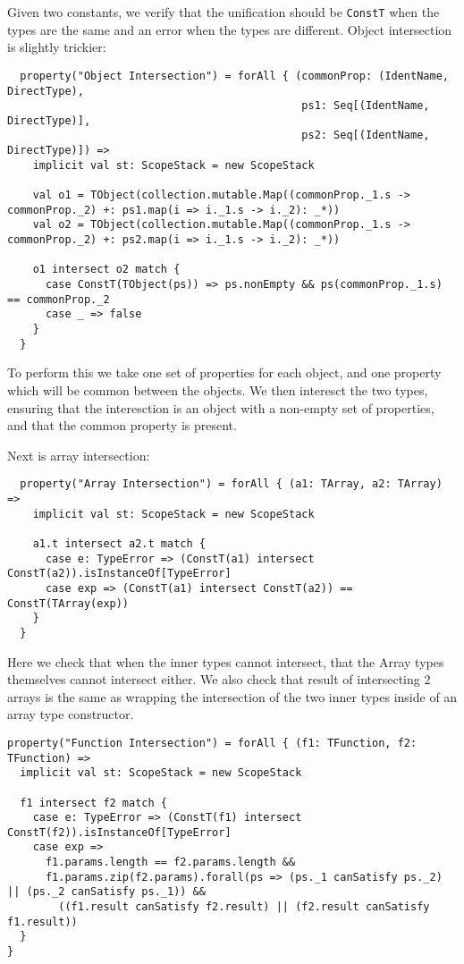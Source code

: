 \documentclass[british, twoside]{bhamthesis}
\theoremstyle{definition}
\begin{document}
      Given two constants, we verify that the unification should be \texttt{ConstT} when the types are the same and an error when the types are different. Object intersection is slightly trickier:
      \begin{lstlisting}
  property("Object Intersection") = forAll { (commonProp: (IdentName, DirectType),
                                              ps1: Seq[(IdentName, DirectType)],
                                              ps2: Seq[(IdentName, DirectType)]) =>
    implicit val st: ScopeStack = new ScopeStack

    val o1 = TObject(collection.mutable.Map((commonProp._1.s -> commonProp._2) +: ps1.map(i => i._1.s -> i._2): _*))
    val o2 = TObject(collection.mutable.Map((commonProp._1.s -> commonProp._2) +: ps2.map(i => i._1.s -> i._2): _*))

    o1 intersect o2 match {
      case ConstT(TObject(ps)) => ps.nonEmpty && ps(commonProp._1.s) == commonProp._2
      case _ => false
    }
  }
    \end{lstlisting}

      To perform this we take one set of properties for each object, and one property which will be common between the objects. We then interesct the two types, ensuring that the interesction is an object with a non-empty set of properties, and that the common property is present.

      Next is array intersection:
      \begin{lstlisting}
  property("Array Intersection") = forAll { (a1: TArray, a2: TArray) =>
    implicit val st: ScopeStack = new ScopeStack

    a1.t intersect a2.t match {
      case e: TypeError => (ConstT(a1) intersect ConstT(a2)).isInstanceOf[TypeError]
      case exp => (ConstT(a1) intersect ConstT(a2)) == ConstT(TArray(exp))
    }
  }
      \end{lstlisting}

      Here we check that when the inner types cannot intersect, that the Array types themselves cannot intersect either. We also check that result of intersecting 2 arrays is the same as wrapping the intersection of the two inner types inside of an array type constructor.

      \begin{lstlisting}
property("Function Intersection") = forAll { (f1: TFunction, f2: TFunction) =>
  implicit val st: ScopeStack = new ScopeStack

  f1 intersect f2 match {
    case e: TypeError => (ConstT(f1) intersect ConstT(f2)).isInstanceOf[TypeError]
    case exp =>
      f1.params.length == f2.params.length &&
      f1.params.zip(f2.params).forall(ps => (ps._1 canSatisfy ps._2) || (ps._2 canSatisfy ps._1)) &&
        ((f1.result canSatisfy f2.result) || (f2.result canSatisfy f1.result))
  }
}
      \end{lstlisting}
\end{document}
